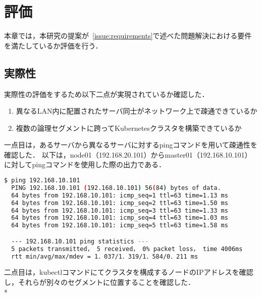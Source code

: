 \chapter{評価}
\label{evaluation}

本章では，本研究の提案が~\ref{issue:requirements}で述べた問題解決における要件を満たしているか評価を行う．

\section{実際性}
\label{evaluation:method}

実際性の評価をするため以下二点が実現されているか確認した．

\begin{enumerate}
  \item 異なるLAN内に配置されたサーバ同士がネットワーク上で疎通できているか
  \item 複数の論理セグメントに跨ってKubernetesクラスタを構築できているか
\end{enumerate}

一点目は，あるサーバから異なるサーバに対するpingコマンドを用いて疎通性を確認した．
以下は，node01（192.168.20.101）からmaster01（192.168.10.101）に対してpingコマンドを使用した際の出力である．

\begin{lstlisting}[language=bash]
  $ ping 192.168.10.101
  PING 192.168.10.101 (192.168.10.101) 56(84) bytes of data.
  64 bytes from 192.168.10.101: icmp_seq=1 ttl=63 time=1.13 ms
  64 bytes from 192.168.10.101: icmp_seq=2 ttl=63 time=1.50 ms
  64 bytes from 192.168.10.101: icmp_seq=3 ttl=63 time=1.33 ms
  64 bytes from 192.168.10.101: icmp_seq=4 ttl=63 time=1.03 ms
  64 bytes from 192.168.10.101: icmp_seq=5 ttl=63 time=1.58 ms

  --- 192.168.10.101 ping statistics ---
  5 packets transmitted， 5 received， 0% packet loss， time 4006ms
  rtt min/avg/max/mdev = 1．037/1．319/1．584/0．211 ms
\end{lstlisting}

二点目は，kubectlコマンドにてクラスタを構成するノードのIPアドレスを確認し，それらが別々のセグメントに位置することを確認した．\\*

